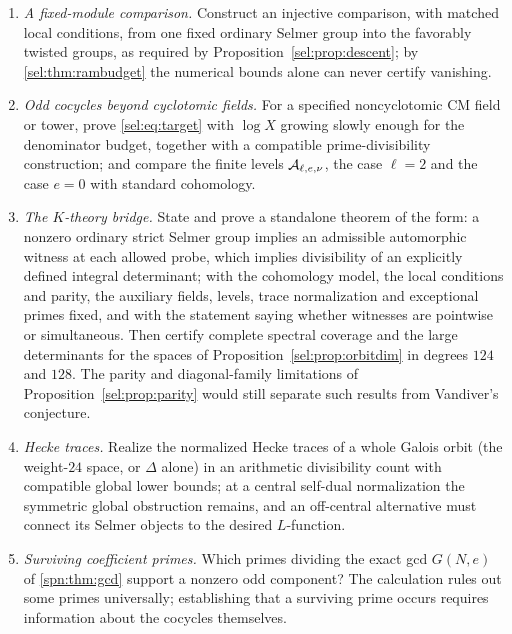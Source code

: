 \begin{enumerate}
divisible Selmer bound of \cref{sel:sec:quantifiers} becomes a statement
about a standard Selmer group.
\item \emph{A fixed-module comparison.} Construct an injective comparison,
with matched local conditions, from one fixed ordinary Selmer group into
the favorably twisted groups, as required by Proposition~\ref{sel:prop:descent}; by
\cref{sel:thm:rambudget} the numerical bounds alone can never certify
vanishing.
\item \emph{Odd cocycles beyond cyclotomic fields.} For a specified
noncyclotomic CM field or tower, prove \eqref{sel:eq:target} with $\log X$
growing slowly enough for the denominator budget, together with a
compatible prime-divisibility construction; and compare the finite levels
$\mathcal{A}_{\ell,e,\nu}$, the case $\ell=2$ and the case $e=0$ with standard
cohomology.
\item \emph{The $K$-theory bridge.} State and prove a standalone theorem of
the form: a nonzero ordinary strict Selmer group implies an admissible
automorphic witness at each allowed probe, which implies divisibility of an
explicitly defined integral determinant; with the cohomology model, the
local conditions and parity, the auxiliary fields, levels, trace
normalization and exceptional primes fixed, and with the statement saying
whether witnesses are pointwise or simultaneous. Then certify complete
spectral coverage and the large determinants for the spaces of
Proposition~\ref{sel:prop:orbitdim} in degrees $124$ and $128$. The parity and
diagonal-family limitations of Proposition~\ref{sel:prop:parity} would still separate
such results from Vandiver's conjecture.
\item \emph{Hecke traces.} Realize the normalized Hecke traces of a whole
Galois orbit (the weight-$24$ space, or $\Delta$ alone) in an arithmetic
divisibility count with compatible global lower bounds; at a central
self-dual normalization the symmetric global obstruction remains, and an
off-central alternative must connect its Selmer objects to the desired
$L$-function.
\item\label{spn:q:primes} \emph{Surviving coefficient primes.} Which primes dividing the exact gcd $G(N,e)$ of \cref{spn:thm:gcd} support a
nonzero odd component? The calculation rules out some primes universally;
establishing that a surviving prime occurs requires information about the
cocycles themselves.
\end{enumerate}
